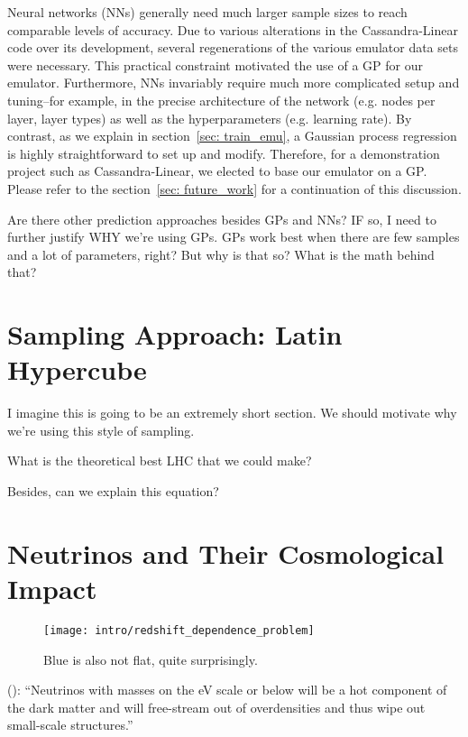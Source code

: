Neural networks (NNs) generally need much larger sample sizes to reach
comparable levels of
accuracy. Due to various alterations in the Cassandra-Linear code over its
development, several regenerations of the various emulator data sets were
necessary. This practical constraint motivated the use of a GP for our
emulator. Furthermore, NNs invariably require much more complicated setup and
tuning--for example, in the precise architecture of the network (e.g. nodes
per layer, layer types) as well as the hyperparameters (e.g. learning rate).
By contrast, as we explain in section~\ref{sec: train_emu}, a Gaussian
process regression is highly straightforward to set up and modify. Therefore,
for a demonstration project such as Cassandra-Linear, we elected to base our
emulator on a GP. Please refer to the section~\ref{sec: future_work} for a
continuation of this discussion.

Are there other prediction approaches besides GPs and NNs? IF so, I need to
further justify WHY we’re using GPs.
GPs work best when there are few samples and a lot of parameters, right?
But why is that so? What is the math behind that?


\section{Sampling Approach: Latin Hypercube}
\label{sec: lhc_theory}

I imagine this is going to be an extremely short section. We should motivate why we're using this style of sampling.

What is the theoretical best LHC that we could make?

Besides, can we explain this equation?


\section{Neutrinos and Their Cosmological Impact}
\label{sec: neutrino_problem}

\begin{figure}[htb]
  \centering
  \texttt{[image: intro/redshift\_dependence\_problem]}
  \caption[Redshift Dependence of Neutrino Impact]{Blue is also not flat,
  	quite surprisingly.}
  \label{fig: neutrinos_and_redshift}
\end{figure}

(): ``Neutrinos with masses on the eV scale or below will be a
hot component of the dark matter and will free-stream out of overdensities and
thus wipe out small-scale structures.''

